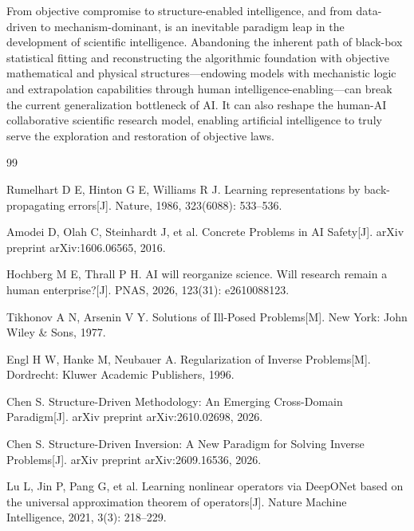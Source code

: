 \documentclass[11pt,a4paper]{article}
\begin{document}
From objective compromise to structure-enabled intelligence, and from data-driven to mechanism-dominant, is an inevitable paradigm leap in the development of scientific intelligence. Abandoning the inherent path of black-box statistical fitting and reconstructing the algorithmic foundation with objective mathematical and physical structures---endowing models with mechanistic logic and extrapolation capabilities through human intelligence-enabling---can break the current generalization bottleneck of AI. It can also reshape the human-AI collaborative scientific research model, enabling artificial intelligence to truly serve the exploration and restoration of objective laws.

\begin{thebibliography}{99}

Rumelhart D E, Hinton G E, Williams R J. Learning representations by back-propagating errors[J]. Nature, 1986, 323(6088): 533--536.

Amodei D, Olah C, Steinhardt J, et al. Concrete Problems in AI Safety[J]. arXiv preprint arXiv:1606.06565, 2016.

Hochberg M E, Thrall P H. AI will reorganize science. Will research remain a human enterprise?[J]. PNAS, 2026, 123(31): e2610088123.

Tikhonov A N, Arsenin V Y. Solutions of Ill-Posed Problems[M]. New York: John Wiley \& Sons, 1977.

Engl H W, Hanke M, Neubauer A. Regularization of Inverse Problems[M]. Dordrecht: Kluwer Academic Publishers, 1996.

Chen S. Structure-Driven Methodology: An Emerging Cross-Domain Paradigm[J]. arXiv preprint arXiv:2610.02698, 2026.

Chen S. Structure-Driven Inversion: A New Paradigm for Solving Inverse Problems[J]. arXiv preprint arXiv:2609.16536, 2026.

Lu L, Jin P, Pang G, et al. Learning nonlinear operators via DeepONet based on the universal approximation theorem of operators[J]. Nature Machine Intelligence, 2021, 3(3): 218--229.

\end{thebibliography}
\end{document}

